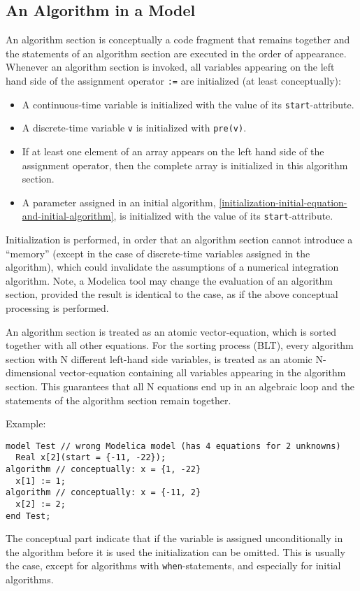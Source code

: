 \subsection{An Algorithm in a Model}\label{execution-of-an-algorithm-in-a-model}\label{an-algorithm-in-a-model}

An algorithm section is conceptually a code fragment that remains together and the statements of an algorithm section are executed in the order of appearance.
Whenever an algorithm section is invoked, all variables appearing on the left hand side of the assignment operator \lstinline!:=! are initialized (at least conceptually):
\begin{itemize}
\item
  A continuous-time variable is initialized with the value of its \lstinline!start!-attribute.
\item
  A discrete-time variable \lstinline!v! is initialized with \lstinline!pre(v)!.
\item
  If at least one element of an array appears on the left hand side of the assignment operator, then the complete array is initialized in this algorithm section.
\item
  A parameter assigned in an initial algorithm, \cref{initialization-initial-equation-and-initial-algorithm}, is initialized with the value of its \lstinline!start!-attribute.
\end{itemize}

\begin{nonnormative}
Initialization is performed, in order that an algorithm section cannot introduce a ``memory'' (except in the case of discrete-time variables assigned in the algorithm), which could invalidate the assumptions of a numerical integration algorithm.
Note, a Modelica tool may change the evaluation of an algorithm section, provided the result is identical to the case, as if the above conceptual processing is performed.

An algorithm section is treated as an atomic vector-equation, which is sorted together with all other equations.
For the sorting process (BLT), every algorithm section with N different left-hand side variables, is treated as an atomic N-dimensional vector-equation containing all variables appearing in the algorithm section.
This guarantees that all N equations end up in an algebraic loop and the statements of the algorithm section remain together.

Example:
\begin{lstlisting}[language=modelica]
model Test // wrong Modelica model (has 4 equations for 2 unknowns)
  Real x[2](start = {-11, -22});
algorithm // conceptually: x = {1, -22}
  x[1] := 1;
algorithm // conceptually: x = {-11, 2}
  x[2] := 2;
end Test;
\end{lstlisting}

The conceptual part indicate that if the variable is assigned unconditionally in the algorithm before it is used the initialization can be omitted.
This is usually the case, except for algorithms with \lstinline!when!-statements, and especially for initial algorithms.
\end{nonnormative}

